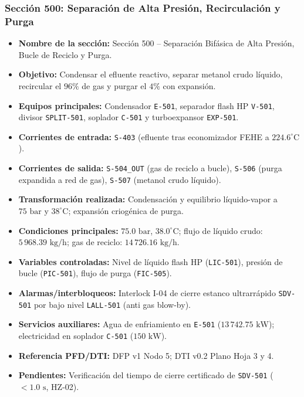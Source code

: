 \documentclass[10pt,letterpaper]{article}
\begin{document}
\subsubsection{Sección 500: Separación de Alta Presión, Recirculación y Purga}
\begin{itemize}
    \item \textbf{Nombre de la sección:} Sección 500 -- Separación Bifásica de Alta Presión, Bucle de Reciclo y Purga.
    \item \textbf{Objetivo:} Condensar el efluente reactivo, separar metanol crudo líquido, recircular el $96\%$ de gas y purgar el $4\%$ con expansión.
    \item \textbf{Equipos principales:} Condensador \texttt{E-501}, separador flash HP \texttt{V-501}, divisor \texttt{SPLIT-501}, soplador \texttt{C-501} y turboexpansor \texttt{EXP-501}.
    \item \textbf{Corrientes de entrada:} \texttt{S-403} (efluente tras economizador FEHE a $224.6^\circ\text{C}$).
    \item \textbf{Corrientes de salida:} \texttt{S-504\_OUT} (gas de reciclo a bucle), \texttt{S-506} (purga expandida a red de gas), \texttt{S-507} (metanol crudo líquido).
    \item \textbf{Transformación realizada:} Condensación y equilibrio líquido-vapor a $75\text{ bar}$ y $38^\circ\text{C}$; expansión criogénica de purga.
    \item \textbf{Condiciones principales:} $75.0\text{ bar}$, $38.0^\circ\text{C}$; flujo de líquido crudo: $5\,968.39\text{ kg/h}$; gas de reciclo: $14\,726.16\text{ kg/h}$.
    \item \textbf{Variables controladas:} Nivel de líquido flash HP (\texttt{LIC-501}), presión de bucle (\texttt{PIC-501}), flujo de purga (\texttt{FIC-505}).
    \item \textbf{Alarmas/interbloqueos:} Interlock I-04 de cierre estanco ultrarrápido \texttt{SDV-501} por bajo nivel \texttt{LALL-501} (anti gas blow-by).
    \item \textbf{Servicios auxiliares:} Agua de enfriamiento en \texttt{E-501} ($13\,742.75\text{ kW}$); electricidad en soplador \texttt{C-501} ($150\text{ kW}$).
    \item \textbf{Referencia PFD/DTI:} DFP v1 Nodo 5; DTI v0.2 Plano Hoja 3 y 4.
    \item \textbf{Pendientes:} Verificación del tiempo de cierre certificado de \texttt{SDV-501} ($<1.0\text{ s}$, HZ-02).
\end{itemize}
\end{document}
